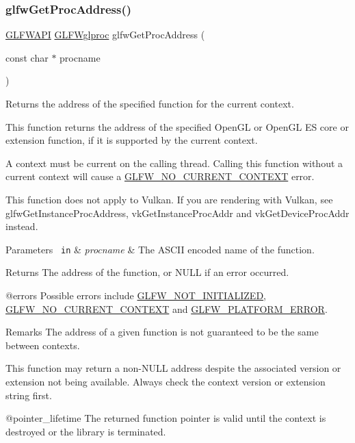 \subsubsection{\texorpdfstring{glfwGetProcAddress()}{glfwGetProcAddress()}}
{\footnotesize\ttfamily \mbox{\hyperlink{glfw3_8h_a56da5036b2cc259351ae22fd6439bb47}{G\+L\+F\+W\+A\+PI}} \mbox{\hyperlink{group__context_ga3d47c2d2fbe0be9c505d0e04e91a133c}{G\+L\+F\+Wglproc}} glfw\+Get\+Proc\+Address (\begin{DoxyParamCaption}\item[{const char $\ast$}]{procname }\end{DoxyParamCaption})}



Returns the address of the specified function for the current context. 

This function returns the address of the specified Open\+GL or Open\+GL ES core or extension function, if it is supported by the current context.

A context must be current on the calling thread. Calling this function without a current context will cause a \mbox{\hyperlink{group__errors_gaa8290386e9528ccb9e42a3a4e16fc0d0}{G\+L\+F\+W\+\_\+\+N\+O\+\_\+\+C\+U\+R\+R\+E\+N\+T\+\_\+\+C\+O\+N\+T\+E\+XT}} error.

This function does not apply to Vulkan. If you are rendering with Vulkan, see glfw\+Get\+Instance\+Proc\+Address, {\ttfamily vk\+Get\+Instance\+Proc\+Addr} and {\ttfamily vk\+Get\+Device\+Proc\+Addr} instead.


\begin{DoxyParams}[1]{Parameters}
\mbox{\texttt{ in}}  & {\em procname} & The A\+S\+C\+II encoded name of the function. \\
\hline
\end{DoxyParams}
\begin{DoxyReturn}{Returns}
The address of the function, or {\ttfamily N\+U\+LL} if an error occurred.
\end{DoxyReturn}
@errors Possible errors include \mbox{\hyperlink{group__errors_ga2374ee02c177f12e1fa76ff3ed15e14a}{G\+L\+F\+W\+\_\+\+N\+O\+T\+\_\+\+I\+N\+I\+T\+I\+A\+L\+I\+Z\+ED}}, \mbox{\hyperlink{group__errors_gaa8290386e9528ccb9e42a3a4e16fc0d0}{G\+L\+F\+W\+\_\+\+N\+O\+\_\+\+C\+U\+R\+R\+E\+N\+T\+\_\+\+C\+O\+N\+T\+E\+XT}} and \mbox{\hyperlink{group__errors_gad44162d78100ea5e87cdd38426b8c7a1}{G\+L\+F\+W\+\_\+\+P\+L\+A\+T\+F\+O\+R\+M\+\_\+\+E\+R\+R\+OR}}.

\begin{DoxyRemark}{Remarks}
The address of a given function is not guaranteed to be the same between contexts.

This function may return a non-\/{\ttfamily N\+U\+LL} address despite the associated version or extension not being available. Always check the context version or extension string first.
\end{DoxyRemark}
@pointer\+\_\+lifetime The returned function pointer is valid until the context is destroyed or the library is terminated.

